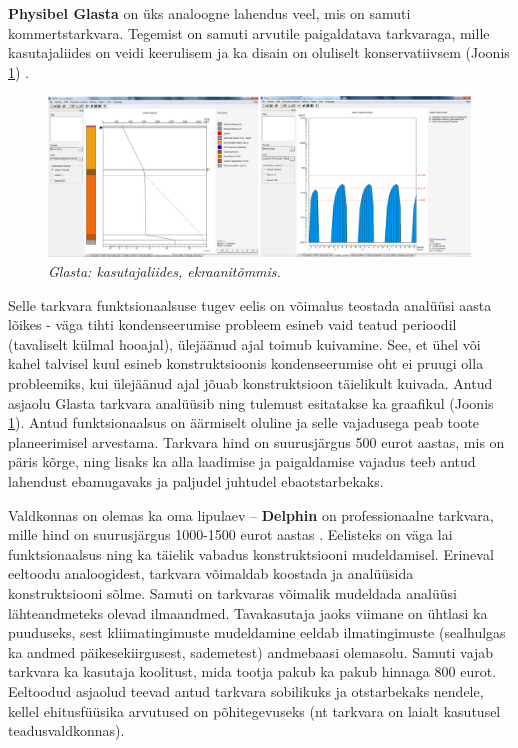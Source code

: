 \textbf{Physibel Glasta} on üks analoogne lahendus veel, mis on samuti kommertstarkvara. Tegemist on samuti arvutile paigaldatava tarkvaraga, mille
kasutajaliides on veidi keerulisem ja ka disain on oluliselt konservatiivsem (Joonis \ref{fig:glasta_sample}) \cite{glasta}. 
\begin{figure}[ht]
    \centering
    \includegraphics[width=1\textwidth]{figures/problem_statement/09_glasta_sample.png}
    \caption[Physibel Glasta tarkvara kasutajaliides, ekraanitõmmis]{\textit{Glasta: kasutajaliides, ekraanitõmmis.}}
    \label{fig:glasta_sample}
\end{figure}

Selle tarkvara funktsionaalsuse tugev eelis on võimalus teostada analüüsi aasta lõikes - väga tihti 
kondenseerumise probleem esineb vaid teatud perioodil (tavaliselt külmal hooajal),
ülejäänud ajal toimub kuivamine. See, et ühel või kahel talvisel kuul esineb konstruktsioonis kondenseerumise oht ei pruugi
olla probleemiks, kui ülejäänud ajal jõuab konstruktsioon täielikult kuivada. Antud asjaolu Glasta tarkvara analüüsib ning 
tulemust esitatakse ka graafikul (Joonis \ref{fig:glasta_sample}). Antud funktsionaalsus on äärmiselt oluline ja selle vajadusega peab toote 
planeerimisel arvestama. Tarkvara hind on suurusjärgus 500 eurot aastas, mis on päris kõrge, ning lisaks ka alla laadimise ja 
paigaldamise vajadus teeb antud lahendust ebamugavaks ja paljudel juhtudel ebaotstarbekaks.

Valdkonnas on olemas ka oma lipulaev -- \textbf{Delphin} on professionaalne tarkvara, mille hind on suurusjärgus 1000-1500 eurot aastas \cite{delphin}.
Eelisteks on väga lai funktsionaalsus ning ka täielik vabadus konstruktsiooni mudeldamisel. Erineval eeltoodu analoogidest,
tarkvara võimaldab koostada ja analüüsida konstruktsiooni sõlme. Samuti on tarkvaras võimalik mudeldada analüüsi lähteandmeteks olevad
ilmaandmed. Tavakasutaja jaoks viimane on ühtlasi ka puuduseks, sest kliimatingimuste mudeldamine eeldab ilmatingimuste 
(sealhulgas ka andmed päikesekiirgusest, sademetest) andmebaasi olemasolu. Samuti vajab tarkvara ka kasutaja koolitust, 
mida tootja pakub ka pakub hinnaga 800 eurot. Eeltoodud asjaolud teevad antud tarkvara sobilikuks ja otstarbekaks
nendele, kellel ehitusfüüsika arvutused on põhitegevuseks (nt tarkvara on laialt kasutusel teadusvaldkonnas). 

